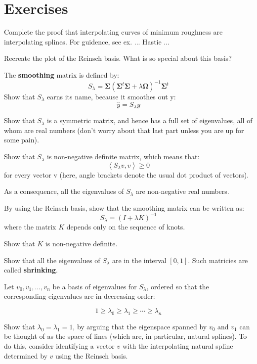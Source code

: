 \section{Exercises}
%
%
\begin{frame}
  Complete the proof that interpolating curves of minimum roughness are interpolating splines.  For guidence, see ex. ... Hastie ...
\end{frame}
%
%
\begin{frame}
  Recreate the plot of the Reinsch basis.  What is so special about this basis?
\end{frame}
%
%
\begin{frame}
  The \textbf{smoothing} matrix is defined by:
  $$ S_{\lambda} = \mathbf{\Sigma} ( \mathbf{\Sigma}^t \mathbf{\Sigma} + \lambda \mathbf{\Omega} )^{-1} \mathbf{\Sigma}^t $$
  Show that $S_{\lambda}$ earns its name, because it smoothes out y:
  $$ \hat{y} = S_{\lambda} y $$
\end{frame}
%
%
\begin{frame}
  Show that $S_{\lambda}$ is a symmetric matrix, and hence has a full set of eigenvalues, all of whom are real numbers (don't worry about that last part unless you are up for some pain).
\end{frame}
%
%
\begin{frame}
  Show that $S_{\lambda}$ is non-negative definite matrix, which means that:
  $$ \left< S_{\lambda} v, v \right> \geq 0 $$
for every vector v (here, angle brackets denote the usual dot product of vectors).

  As a consequence, all the eigenvalues of $S_{\lambda}$ are non-negative real numbers.
\end{frame}
%
%
\begin{frame}
  By using the Reinsch basis, show that the smoothing matrix can be written as:
  $$ S_{\lambda} = (I + \lambda K)^{-1} $$
where the matrix $K$ depends only on the sequence of knots.
\end{frame}
%
%
\begin{frame}
  Show that $K$ is non-negative definite.
\end{frame}
%
%
\begin{frame}
  Show that all the eigenvalues of $S_{\lambda}$ are in the interval $[0, 1]$.  Such matricies are called \textbf{shrinking}.
\end{frame}
%
%
\begin{frame}
  Let $v_0, v_1, \ldots, v_n$ be a basis of eigenvalues for $S_{\lambda}$, ordered so that the corresponding eigenvalues are in decreasing order: 
  
  $$1 \geq \lambda_0 \geq \lambda_1 \geq \cdots \geq \lambda_n $$

  Show that $\lambda_0 = \lambda_1 = 1$, by arguing that the eigenspace spanned by $v_0$ and $v_1$ can be thought of as the space of lines (which are, in particular, natural splines).  To do this, consider identifying a vector $v$ with the interpolating natural spline determined by $v$ using the Reinsch basis.
\end{frame}
